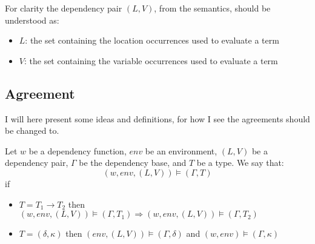 \documentclass[../../master.tex]{subfiles}
\begin{document}
For clarity the dependency pair $(L,V)$, from the semantics, should be understood as:
\begin{itemize}
	\item $L$: the set containing the location occurrences used to evaluate a term
	\item $V$: the set containing the variable occurrences used to evaluate a term
\end{itemize}

\subsection{Agreement}
I will here present some ideas and definitions, for how I see the agreements should be changed to.


\begin{definition}
	Let $w$ be a dependency function, $env$ be an environment, $(L,V)$ be a dependency pair, $\Gamma$ be the dependency base, and $T$ be a type.
	We say that:
	$$(w,env,(L,V))\models(\Gamma,T)$$
	if
	\begin{itemize}
		\item $T=T_1\rightarrow T_2$ then $(w,env,(L,V))\models(\Gamma,T_1)\Rightarrow(w,env,(L,V))\models(\Gamma,T_2)$
		\item $T=(\delta,\kappa)$ then $(env,(L,V))\models(\Gamma,\delta)$ and $(w,env)\models(\Gamma,\kappa)$
	\end{itemize}
\end{definition}
\end{document}
